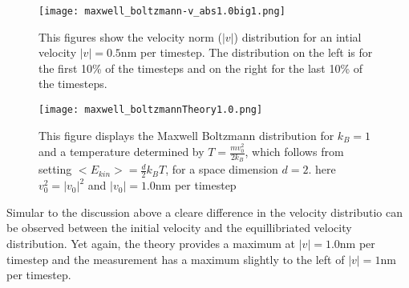 \documentclass{article}
\begin{document}
\begin{figure}[h]
    \texttt{[image: maxwell\_boltzmann-v\_abs1.0big1.png]}
    \caption{This figures show the velocity norm ($|v|$) distribution for an intial velocity $|v|=0.5$nm per timestep. The distribution on the left is for the first 10\% of the timesteps and on the right for the last 10\% of the timesteps.}
    \label{vabs10}
\end{figure}

\begin{figure}[h]
    \texttt{[image: maxwell\_boltzmannTheory1.0.png]}
    \caption{This figure displays the Maxwell Boltzmann distribution for  $k_B=1$ and a temperature determined by $T=\frac{m v_0^2}{2k_B}$, which follows from setting $<E_{kin}> =\frac{d}{2}k_BT$, for a space dimension $d=2$. here $v_0^2=|v_0|^2$ and $|v_0|=1.0$nm per timestep}
    \label{mwbolts10}
\end{figure}

Simular to the discussion above a cleare difference in the velocity distributio can be observed between the initial velocity and the equillibriated velocity distribution. Yet again, the theory provides a maximum at $|v|=1.0$nm per timestep and the measurement has a maximum slightly to the left of $|v|=1$nm per timestep.
\end{document}
